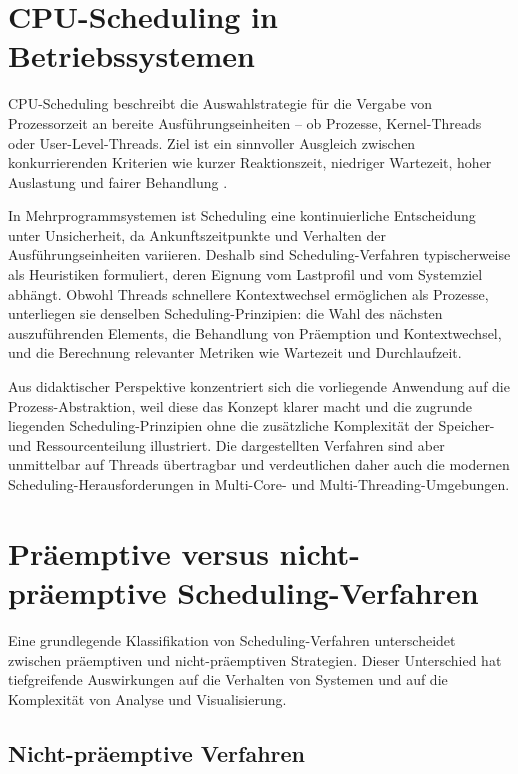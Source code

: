 \section{CPU-Scheduling in Betriebssystemen}

CPU-Scheduling beschreibt die Auswahlstrategie für die Vergabe von Prozessorzeit an bereite Ausführungseinheiten – ob Prozesse, Kernel-Threads oder User-Level-Threads. Ziel ist ein sinnvoller Ausgleich zwischen konkurrierenden Kriterien wie kurzer Reaktionszeit, niedriger Wartezeit, hoher Auslastung und fairer Behandlung \cite{pinedo2016scheduling,silberschatz2018operating}.

In Mehrprogrammsystemen ist Scheduling eine kontinuierliche Entscheidung unter Unsicherheit, da Ankunftszeitpunkte und Verhalten der Ausführungseinheiten variieren. Deshalb sind Scheduling-Verfahren typischerweise als Heuristiken formuliert, deren Eignung vom Lastprofil und vom Systemziel abhängt. Obwohl Threads schnellere Kontextwechsel ermöglichen als Prozesse, unterliegen sie denselben Scheduling-Prinzipien: die Wahl des nächsten auszuführenden Elements, die Behandlung von Präemption und Kontextwechsel, und die Berechnung relevanter Metriken wie Wartezeit und Durchlaufzeit.

Aus didaktischer Perspektive konzentriert sich die vorliegende Anwendung auf die Prozess-Abstraktion, weil diese das Konzept klarer macht und die zugrunde liegenden Scheduling-Prinzipien ohne die zusätzliche Komplexität der Speicher- und Ressourcenteilung illustriert. Die dargestellten Verfahren sind aber unmittelbar auf Threads übertragbar und verdeutlichen daher auch die modernen Scheduling-Herausforderungen in Multi-Core- und Multi-Threading-Umgebungen.

\section{Präemptive versus nicht-präemptive Scheduling-Verfahren}

Eine grundlegende Klassifikation von Scheduling-Verfahren unterscheidet zwischen präemptiven und nicht-präemptiven Strategien. Dieser Unterschied hat tiefgreifende Auswirkungen auf die Verhalten von Systemen und auf die Komplexität von Analyse und Visualisierung.

\subsection{Nicht-präemptive Verfahren}

